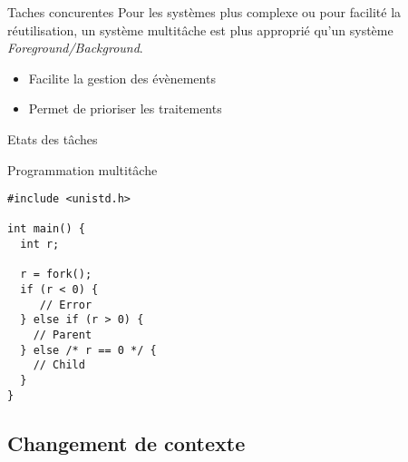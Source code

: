 \begin{frame}{Taches concurentes}
  Pour les  systèmes plus complexe ou pour  facilité la réutilisation,
  un   système   multitâche   est   plus   approprié   qu'un   système
  \emph{Foreground/Background}.
  \begin{itemize} 
  \item Facilite la gestion des évènements
  \item Permet de prioriser les traitements
  \end{itemize} 
\end{frame} 

\begin{frame}{Etats des tâches}
  \begin{center}
  \end{center}
\end{frame} 

\begin{frame}[fragile]{Programmation multitâche}
\begin{lstlisting}
#include <unistd.h>

int main() {
  int r;

  r = fork();
  if (r < 0) {
     // Error
  } else if (r > 0) {
    // Parent
  } else /* r == 0 */ {
    // Child
  }
}
\end{lstlisting} 
\end{frame} 

\subsection{Changement de contexte}

